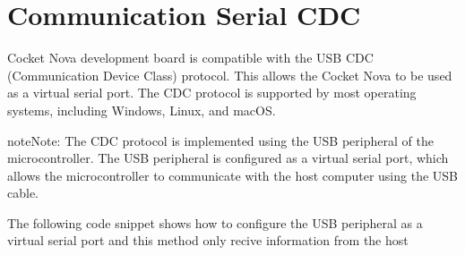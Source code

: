 \documentclass[letterpaper,10pt,english]{sphinxmanual}
\begin{document}
\begin{sphinxVerbatim}[commandchars=\\\{\}]
\end{sphinxVerbatim}

\sphinxstepscope


\chapter{Communication Serial CDC}
\label{\detokenize{cdc:communication-serial-cdc}}\label{\detokenize{cdc::doc}}
\sphinxAtStartPar
Cocket Nova development board  is compatible with the USB CDC (Communication Device Class) protocol. This allows the Cocket Nova
to be used as a virtual serial port. The CDC protocol is supported by most operating systems, including
Windows, Linux, and macOS.

\begin{sphinxadmonition}{note}{Note:}
\sphinxAtStartPar
The CDC protocol is implemented using the USB peripheral of the microcontroller. The USB peripheral is
configured as a virtual serial port, which allows the microcontroller to communicate with the host computer
using the USB cable.
\end{sphinxadmonition}

\sphinxAtStartPar
The following code snippet shows how to configure the USB peripheral as a virtual serial port and this method
only recive information from the host
\end{document}
